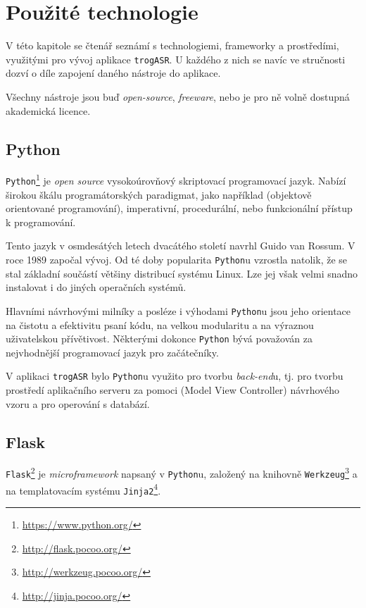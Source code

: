 \chapter{Použité technologie}

V této kapitole se čtenář seznámí s technologiemi, frameworky a prostředími, využitými pro vývoj aplikace \verb|trogASR|. U každého z nich se navíc ve stručnosti dozví o díle zapojení daného nástroje do aplikace.

Všechny nástroje jsou buď {\sl open-source}, {\sl freeware}, nebo je pro ně volně dostupná akademická licence.

\section{Python}

\verb|Python|\footnote{\url{https://www.python.org/}} je {\sl open source} vysokoúrovňový skriptovací programovací jazyk. Nabízí širokou škálu programátorských paradigmat, jako například  (objektově orientované programování), imperativní, procedurální, nebo funkcionální přístup k programování.

Tento jazyk v osmdesátých letech dvacátého století navrhl Guido van Rossum. V roce 1989 započal vývoj. Od té doby popularita \verb|Python|u vzrostla natolik, že se stal základní součástí většiny distribucí systému Linux. Lze jej však velmi snadno instalovat i do jiných operačních systémů.

Hlavními návrhovými milníky a posléze i výhodami \verb|Python|u jsou jeho orientace na čistotu a efektivitu psaní kódu, na velkou modularitu a na výraznou uživatelskou přívětivost. Některými dokonce \verb|Python| bývá považován za nejvhodnější programovací jazyk pro začátečníky.

V aplikaci \verb|trogASR| bylo \verb|Python|u využito pro tvorbu {\sl back-end}u, tj. pro tvorbu prostředí aplikačního serveru za pomoci  (Model View Controller) návrhového vzoru a pro operování s databází.

\section{Flask}

\verb|Flask|\footnote{\url{http://flask.pocoo.org/}} je {\sl microframework} napsaný v \verb|Python|u, založený na knihovně \verb|Werkzeug|\footnote{\url{http://werkzeug.pocoo.org/}} a na templatovacím systému \verb|Jinja2|\footnote{\url{http://jinja.pocoo.org/}}.

